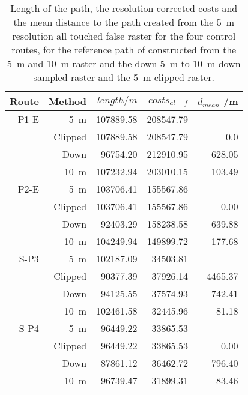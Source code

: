 \begin{table}[h!]
	\caption{Length of the path, the resolution corrected costs and the mean distance to the path created from the 5~m resolution all touched false raster for the four control routes, for the reference path of constructed from the 5~m  and 10~m raster and the down 5~m to 10~m down sampled raster and the 5~m clipped raster.}
	\label{tab:6}
	\centering
	\begin{tabular}{ r  r  r  r  r}
		Route & Method & $length /m$ & $costs_{al=f}$ & $d_{mean}$ /m \\
		\hline
		P1-E & 5~m 			& 107889.58 & 208547.79 &        \\
		 	 & Clipped 		& 107889.58 & 208547.79 &   0.0  \\
		 	 & Down			&  96754.20 & 212910.95 & 628.05 \\
		 	 & 10~m 		& 107232.94 & 203010.15 & 103.49 \\
		\hline
		P2-E & 5~m 			& 103706.41 & 155567.86 &        \\
		 	 & Clipped 		& 103706.41 & 155567.86 &   0.00 \\
		 	 & Down 	    &  92403.29 & 158238.58	& 639.88 \\
		 	 & 10~m 		& 104249.94 & 149899.72 & 177.68 \\
		\hline
		S-P3 & 5~m 			& 102187.09 & 34503.81 	&         \\
			 & Clipped 		&  90377.39 & 37926.14 	& 4465.37 \\
			 & Down 	    &  94125.55 & 37574.93 	&  742.41 \\
			 & 10~m 		& 102461.58 & 32445.96 	&   81.18 \\
		\hline
		S-P4 & 5~m 			& 96449.22 	& 33865.53 	&  		\\
		 	 & Clipped 		& 96449.22 	& 33865.53 	& 0.00 	\\
			 & Down 		& 87861.12 	& 36462.72 	& 796.40\\
			 & 10~m 		& 96739.47 	& 31899.31	& 83.46 \\

		
	\end{tabular}
\end{table}



